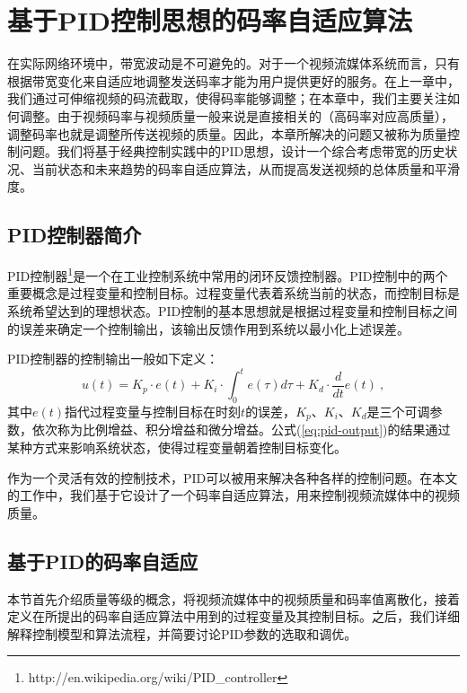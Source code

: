 \chapter{基于PID控制思想的码率自适应算法}

在实际网络环境中，带宽波动是不可避免的。对于一个视频流媒体系统而言，只有根据带宽变化来自适应地调整发送码率才能为用户提供更好的服务。在上一章中，我们通过可伸缩视频的码流截取，使得码率能够调整；在本章中，我们主要关注如何调整。由于视频码率与视频质量一般来说是直接相关的（高码率对应高质量），调整码率也就是调整所传送视频的质量。因此，本章所解决的问题又被称为质量控制问题。我们将基于经典控制实践中的PID思想，设计一个综合考虑带宽的历史状况、当前状态和未来趋势的码率自适应算法，从而提高发送视频的总体质量和平滑度。

\section{PID控制器简介}

PID控制器\footnote{http://en.wikipedia.org/wiki/PID\_controller}是一个在工业控制系统中常用的闭环反馈控制器。PID控制中的两个重要概念是过程变量和控制目标。过程变量代表着系统当前的状态，而控制目标是系统希望达到的理想状态。PID控制的基本思想就是根据过程变量和控制目标之间的误差来确定一个控制输出，该输出反馈作用到系统以最小化上述误差。

PID控制器的控制输出一般如下定义：
\begin{equation}
\label{eq:pid-output}
u(t) = {K_p} \cdot e(t) + {K_i} \cdot \int_0^t {e(\tau )d\tau }  + {K_d} \cdot \frac{d}{{dt}}e(t) \: ,
\end{equation}
其中$e(t)$指代过程变量与控制目标在时刻$t$的误差，$K_p$、$K_i$、$K_d$是三个可调参数，依次称为比例增益、积分增益和微分增益。公式(\ref{eq:pid-output})的结果通过某种方式来影响系统状态，使得过程变量朝着控制目标变化。

作为一个灵活有效的控制技术，PID可以被用来解决各种各样的控制问题\supercite{Wong2004}\supercite{Li1999}。在本文的工作中，我们基于它设计了一个码率自适应算法，用来控制视频流媒体中的视频质量。

\section{基于PID的码率自适应}

本节首先介绍质量等级的概念，将视频流媒体中的视频质量和码率值离散化，接着定义在所提出的码率自适应算法中用到的过程变量及其控制目标。之后，我们详细解释控制模型和算法流程，并简要讨论PID参数的选取和调优。

